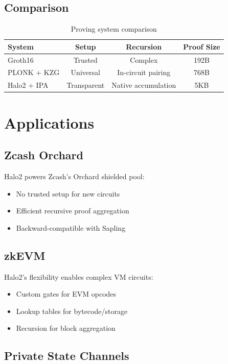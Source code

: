 \documentclass[11pt,a4paper]{article}
\begin{document}
\subsection{Comparison}

\begin{table}[h]
\centering
\begin{tabular}{lccc}
\toprule
\textbf{System} & \textbf{Setup} & \textbf{Recursion} & \textbf{Proof Size} \\
\midrule
Groth16 & Trusted & Complex & 192B \\
PLONK + KZG & Universal & In-circuit pairing & 768B \\
Halo2 + IPA & Transparent & Native accumulation & 5KB \\
\bottomrule
\end{tabular}
\caption{Proving system comparison}
\label{tab:systems}
\end{table}

\section{Applications}

\subsection{Zcash Orchard}

Halo2 powers Zcash's Orchard shielded pool:
\begin{itemize}
    \item No trusted setup for new circuits
    \item Efficient recursive proof aggregation
    \item Backward-compatible with Sapling
\end{itemize}

\subsection{zkEVM}

Halo2's flexibility enables complex VM circuits:
\begin{itemize}
    \item Custom gates for EVM opcodes
    \item Lookup tables for bytecode/storage
    \item Recursion for block aggregation
\end{itemize}

\subsection{Private State Channels}
\end{document}
